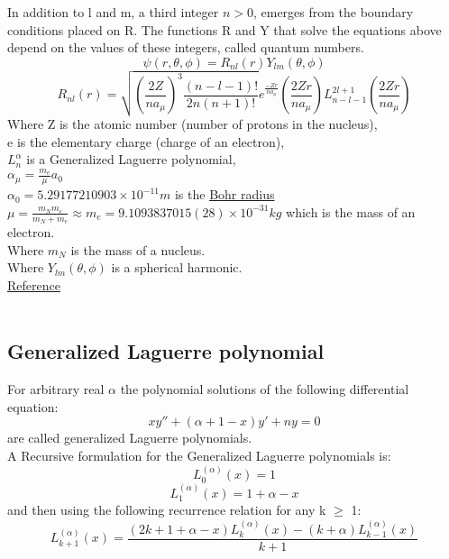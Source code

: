 \documentclass[12pt]{extarticle}
\theoremstyle{Definition}
\begin{document}
In addition to l and m, a third integer $n > 0$, emerges from the boundary conditions placed on R. The functions R and Y that solve the equations above depend on the values of these integers, called quantum numbers. \\ 
$$\psi (r,\theta ,\phi )=R_{nl}(r)Y_{lm}(\theta ,\phi )$$
$$R_{nl}(r) = \sqrt{\left(\frac{2Z}{na_\mu}\right)^3\frac{(n-l-1)!}{2n(n+1)!}}e^{\frac{-Zr}{na_\mu}}\left(\frac{2Zr}{na_\mu}\right)L_{n-l-1}^{2l+1}\left(\frac{2Zr}{na_\mu}\right) $$
Where Z is the atomic number (number of protons in the nucleus), \\
e is the elementary charge (charge of an electron), \\
$L_n^\alpha$ is a Generalized Laguerre polynomial, \\
$\alpha_\mu = \frac{m_e}{\mu}a_0$ \\
$\alpha_0 = 5.29177210903\times10^{-11} m$ is the \href{https://en.wikipedia.org/wiki/Bohr_radius}{Bohr radius} \\
$\mu = \frac{m_Nm_e}{m_N + m_e} \approx m_e = 9.1093837015(28)\times10^{-31} kg$ which is the mass of an electron. \\
Where $m_N$ is the mass of a nucleus. \\ 
Where $Y_{lm}(\theta ,\phi )$ is a spherical harmonic. \\ 
\href{https://en.wikipedia.org/wiki/Hydrogen-like_atom}{Reference} \\ \\
\subsection{Generalized Laguerre polynomial}
For arbitrary real $\alpha$ the polynomial solutions of the following differential equation: 
$$xy'' + (\alpha +1 - x)y' + ny = 0$$
are called generalized Laguerre polynomials. \\
A Recursive formulation for the Generalized Laguerre polynomials is: \\
$$L_{0}^{(\alpha )}(x)=1
$$
$$L_{1}^{(\alpha )}(x)=1+\alpha -x
$$
and then using the following recurrence relation for any k $\geq$ 1:
$$L_{k+1}^{(\alpha )}(x)={\frac {(2k+1+\alpha -x)L_{k}^{(\alpha )}(x)-(k+\alpha )L_{k-1}^{(\alpha )}(x)}{k+1}}$$
\end{document}
